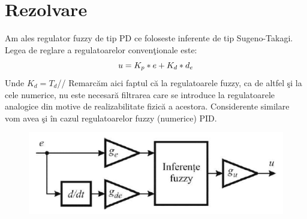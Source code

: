 \documentclass[11pt]{article}
\newcommand{\EqRow}{\vspace{1.5mm}}
\begin{document}
\section{Rezolvare}

Am ales regulator fuzzy de tip PD ce foloseste inferente de tip Sugeno-Takagi.
Legea de reglare a regulatoarelor convenţionale este:
\begin{equation} 
u=K_p*e+K_d*d_e
\EqRow
\end{equation}
Unde $K_d=T_d$// Remarcăm aici faptul că la regulatoarele fuzzy, ca de altfel şi la cele numerice, nu este necesară filtrarea care se introduce la regulatoarele analogice din motive de realizabilitate fizică a acestora. Considerente similare vom avea şi în cazul regulatoarelor fuzzy (numerice) PID.

\begin{figure}[H]
	\centering
	\includegraphics[width=0.4\linewidth]{schema_pid.PNG}
	\label{fig:test2}
\end{figure}
\end{document}
